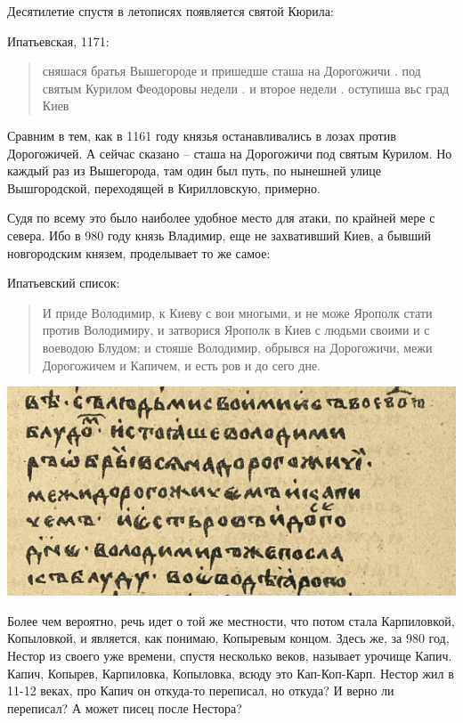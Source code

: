 Десятилетие спустя в летописях появляется святой Кюрила:

Ипатьевская, 1171:

\begin{quotation}
сняшася братья Вышегороде и пришедше сташа на Дорогожичи . под святым Курилом Феодоровы недели . и второе недели . оступиша вьс град Киев
\end{quotation}

Сравним в тем, как в 1161 году князья останавливались в лозах против Дорогожичей. А сейчас сказано – сташа на Дорогожичи под святым Курилом. Но каждый раз из Вышегорода, там один был путь, по нынешней улице Вышгородской, переходящей в Кирилловскую, примерно.

Судя по всему это было наиболее удобное место для атаки, по крайней мере с севера. Ибо в 980 году князь Владимир, еще не захвативший Киев, а бывший новгородским князем, проделывает то же самое:

Ипатьевский список:

\begin{quotation}
И приде Володимир, к Киеву с вои многыми, и не може Ярополк стати против Володимиру, и затворися Ярополк в Киев с людьми своими и с воеводою Блудом; и стояше Володимир, обрывся на Дорогожичи, межи Дорогожичем и
Капичем, и есть ров и до сего дне.
\end{quotation}

\begin{center}
\includegraphics[width=\linewidth]{chast-zmiy/kopyl/kapich.png}
\end{center}

Более чем вероятно, речь идет о той же местности, что потом стала Карпиловкой, Копыловкой, и является, как понимаю, Копыревым концом. Здесь же, за 980 год, Нестор из своего уже времени, спустя несколько веков, называет урочище Капич. Капич, Копырев, Карпиловка, Копыловка, всюду это Кап-Коп-Карп. Нестор жил в 11-12 веках, про Капич он откуда-то переписал, но откуда? И верно ли переписал? А может писец после Нестора?

